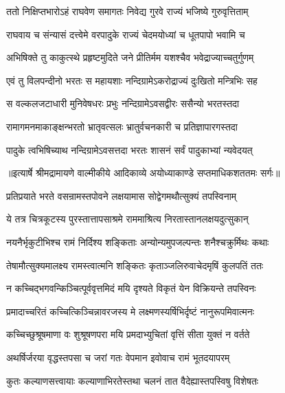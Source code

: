 \twolineshloka
{ततो निक्षिप्तभारोऽहं राघवेण समागतः}
{निवेद्य गुरवे राज्यं भजिष्ये गुरुवृत्तिताम्} %

\twolineshloka
{राघवाय च संन्यासं दत्त्वेमे वरपादुके}
{राज्यं चेदमयोध्यां च धूतपापो भवामि च} %

\twolineshloka
{अभिषिक्ते तु काकुत्स्थे प्रहृष्टमुदिते जने}
{प्रीतिर्मम यशश्चैव भवेद्राज्याच्चतुर्गुणम्} %

\twolineshloka
{एवं तु विलपन्दीनो भरतः स महायशाः}
{नन्दिग्रामेऽकरोद्राज्यं दुःखितो मन्त्रिभिः सह} %

\twolineshloka
{स वल्कलजटाधारी मुनिवेषधरः प्रभुः}
{नन्दिग्रामेऽवसद्वीरः ससैन्यो भरतस्तदा} %

\twolineshloka
{रामागमनमाकाङ्क्षन्भरतो भ्रातृवत्सलः}
{भ्रातुर्वचनकारी च प्रतिज्ञापारगस्तदा} %

\twolineshloka
{पादुके त्वभिषिच्याथ नन्दिग्रामेऽवसत्तदा}
{भरतः शासनं सर्वं पादुकाभ्यां न्यवेदयत्} %


{॥इत्यार्षे श्रीमद्रामायणे वाल्मीकीये आदिकाव्ये अयोध्याकाण्डे सप्तमाधिकशततमः सर्गः॥}


\twolineshloka
{प्रतिप्रयाते भरते वसन्रामस्तपोवने}
{लक्षयामास सोद्वेगमथौत्सुक्यं तपस्विनाम्} %

\twolineshloka
{ये तत्र चित्रकूटस्य पुरस्तात्तापसाश्रमे}
{राममाश्रित्य निरतास्तानलक्षयदुत्सुकान्} %

\twolineshloka
{नयनैर्भृकुटीभिश्च रामं निर्दिश्य शङ्किताः}
{अन्योन्यमुपजल्पन्तः शनैश्चक्रुर्मिथः कथाः} %

\twolineshloka
{तेषामौत्सुक्यमालक्ष्य रामस्त्वात्मनि शङ्कितः}
{कृताञ्जलिरुवाचेदमृषिं कुलपतिं ततः} %

\twolineshloka
{न कच्चिद्भगवन्किञ्चित्पूर्ववृत्तमिदं मयि}
{दृश्यते विकृतं येन विक्रियन्ते तपस्विनः} %

\twolineshloka
{प्रमादाच्चरितं कच्चित्किञ्चिन्नावरजस्य मे}
{लक्ष्मणस्यर्षिभिर्दृष्टं नानुरूपमिवात्मनः} %

\twolineshloka
{कच्चिच्छुश्रूषमाणा वः शुश्रूषणपरा मयि}
{प्रमदाभ्युचितां वृत्तिं सीता युक्तं न वर्तते} %

\twolineshloka
{अथर्षिर्जरया वृद्धस्तपसा च जरां गतः}
{वेपमान इवोवाच रामं भूतदयापरम्} %

\twolineshloka
{कुतः कल्याणसत्त्वायाः कल्याणाभिरतेस्तथा}
{चलनं तात वैदेह्यास्तपस्विषु विशेषतः} %

